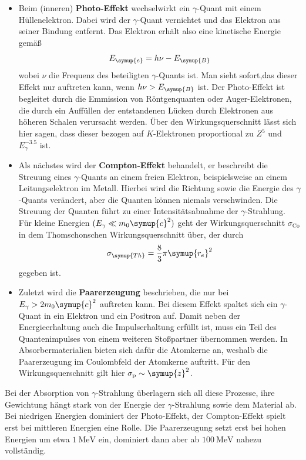\begin{itemize}
    \item Beim (inneren) \textbf{Photo-Effekt} wechselwirkt ein $\gamma$-Quant mit einem Hüllenelektron.
    Dabei wird der $\gamma$-Quant vernichtet und das Elektron aus seiner Bindung entfernt.
    Das Elektron erhält also eine kinetische Energie gemäß
    \begin{equation*}
        E_{\symup{e}} = h\nu - E_{\symup{B}}
    \end{equation*}
    wobei $\nu$ die Frequenz des beteiligten $\gamma$-Quants ist. Man sieht sofort,das dieser Effekt nur
    auftreten kann, wenn $h\nu > E_{\symup{B}}$ ist.
    Der Photo-Effekt ist begleitet durch die Emmission von Röntgenquanten oder Auger-Elektronen, die durch
    ein Auffüllen der entstandenen Lücken durch Elektronen aus höheren Schalen verursacht werden.
    Über den Wirkungsquerschnitt lässt sich hier sagen, dass dieser bezogen auf $K$-Elektronen
    proportional zu $Z^5$ und $E_\gamma^{-3.5}$ ist.

    \item Als nächstes wird der \textbf{Compton-Effekt} behandelt, er beschreibt die Streuung eines
    $\gamma$-Quants an einem freien Elektron, beispielsweise an einem Leitungselektron im Metall.
    Hierbei wird die Richtung sowie die Energie des $\gamma$-Quants verändert, aber die Quanten können
    niemals verschwinden. Die Streuung der Quanten führt zu einer Intensitätsabnahme der $\gamma$-Strahlung.
    Für kleine Energien $(E_\gamma \ll m_0 \symup{c}^2)$ geht der Wirkungsquerschnitt $\sigma_{\text{Co}}$
    in dem Thomschonschen Wirkungsquerschnitt über, der durch
    \begin{equation}
        \sigma_{\symup{Th}} = \frac{8}{3}\pi \symup{r_e}^2 \notag
    \end{equation}
    gegeben ist.

    \item Zuletzt wird die \textbf{Paarerzeugung} beschrieben, die nur bei $E_\gamma > 2m_0 \symup{c}^2$ auftreten kann.
    Bei diesem Effekt spaltet sich ein $\gamma$-Quant in ein Elektron und ein Positron auf.
    Damit neben der Energieerhaltung auch die Impulserhaltung erfüllt ist, muss ein Teil des Quantenimpulses von
    einem weiteren Stoßpartner übernommen werden. In Absorbermaterialien bieten sich dafür die Atomkerne an,
    weshalb die Paarerzeugung im Coulombfeld der Atomkerne auftritt.
    Für den Wirkungsquerschnitt gilt hier $\sigma_{\text{p}} \sim \symup{z}^2$.
\end{itemize}

Bei der Absorption von $\gamma$-Strahlung überlagern sich all diese Prozesse, ihre Gewichtung hängt stark von der
Energie der $\gamma$-Strahlung sowie dem Material ab.
Bei niedrigen Energien dominiert der Photo-Effekt, der Compton-Effekt spielt erst bei mittleren Energien eine Rolle.
Die Paarerzeugung setzt erst bei hohen Energien um etwa $\qty{1}{\mega\electronvolt}$ ein, dominiert dann aber
ab $\qty{100}{\mega\electronvolt}$ nahezu vollständig.